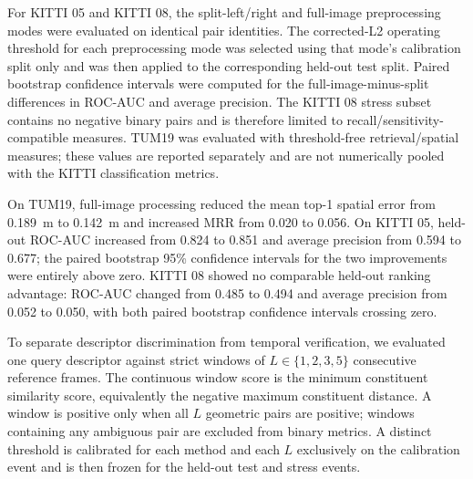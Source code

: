 \documentclass{ieeeaccess}
\newenvironment{revisionblock}
{%
  \par
  \begingroup
  \setlength{\fboxsep}{1pt}%
  \setlength{\OuterFrameSep}{0pt}%
  \def\FrameCommand##1{%
    \colorbox{white}{\color{revisionred}##1}%
  }%
  \MakeFramed{%
    \advance\hsize-2\fboxsep
    \FrameRestore
  }%
}
{%
  \endMakeFramed
  \endgroup
  \par
}
\renewenvironment{revisionblock}
  {\par\begingroup\color{revisionred}}
  {\par\endgroup}
\begin{document}
\begin{revisionblock}
\small

For KITTI 05 and KITTI 08, the split-left/right and full-image preprocessing
modes were evaluated on identical pair identities. The corrected-L2 operating
threshold for each preprocessing mode was selected using that mode's
calibration split only and was then applied to the corresponding held-out test
split. Paired bootstrap confidence intervals were computed for the
full-image-minus-split differences in ROC-AUC and average precision. The
KITTI 08 stress subset contains no negative binary pairs and is therefore
limited to recall/sensitivity-compatible measures. TUM19 was evaluated with
threshold-free retrieval/spatial measures; these values are reported
separately and are not numerically pooled with the KITTI classification
metrics.

On TUM19, full-image processing reduced the mean top-1 spatial error from
0.189~m to 0.142~m and increased MRR from 0.020 to 0.056. On KITTI 05,
held-out ROC-AUC increased from 0.824 to 0.851 and average precision from
0.594 to 0.677; the paired bootstrap 95\% confidence intervals for the two
improvements were entirely above zero. KITTI 08 showed no comparable
held-out ranking advantage: ROC-AUC changed from 0.485 to 0.494 and average
precision from 0.052 to 0.050, with both paired bootstrap confidence
intervals crossing zero.

To separate descriptor discrimination from temporal verification, we evaluated one query descriptor against strict windows of $L\in\{1,2,3,5\}$ consecutive reference frames. The continuous window score is the minimum constituent similarity score, equivalently the negative maximum constituent distance. A window is positive only when all $L$ geometric pairs are positive; windows containing any ambiguous pair are excluded from binary metrics. A distinct threshold is calibrated for each method and each $L$ exclusively on the calibration event and is then frozen for the held-out test and stress events.
\end{revisionblock}
\end{document}
